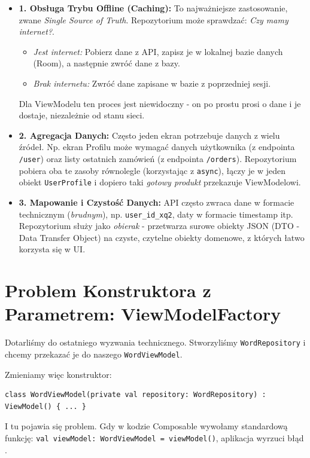 \begin{itemize}
    \item \textbf{1. Obsługa Trybu Offline (Caching):} 
    To najważniejsze zastosowanie, zwane \textit{Single Source of Truth}. Repozytorium może sprawdzać: \textit{Czy mamy internet?}.
    \begin{itemize}
        \item \textit{Jest internet:} Pobierz dane z API, zapisz je w lokalnej bazie danych (Room), a następnie zwróć dane z bazy.
        \item \textit{Brak internetu:} Zwróć dane zapisane w bazie z poprzedniej sesji.
    \end{itemize}
    Dla ViewModelu ten proces jest niewidoczny - on po prostu prosi o dane i je dostaje, niezależnie od stanu sieci.

    \item \textbf{2. Agregacja Danych:}
    Często jeden ekran potrzebuje danych z wielu źródeł. Np. ekran Profilu może wymagać danych użytkownika (z endpointa \texttt{/user}) oraz listy ostatnich zamówień (z endpointa \texttt{/orders}). Repozytorium pobiera oba te zasoby równolegle (korzystając z \texttt{async}), łączy je w jeden obiekt \texttt{UserProfile} i dopiero taki \textit{gotowy produkt} przekazuje ViewModelowi.

    \item \textbf{3. Mapowanie i Czystość Danych:}
    API często zwraca dane w formacie technicznym (\textit{brudnym}), np. \texttt{user\_id\_xq2}, daty w formacie timestamp itp. Repozytorium służy jako \textit{obierak} - przetwarza surowe obiekty JSON (DTO - Data Transfer Object) na czyste, czytelne obiekty domenowe, z których łatwo korzysta się w UI.
\end{itemize}

\section{Problem Konstruktora z Parametrem: ViewModelFactory}

Dotarliśmy do ostatniego wyzwania technicznego. Stworzyliśmy \texttt{WordRepository} i chcemy przekazać je do naszego \texttt{WordViewModel}.

Zmieniamy więc konstruktor:
\begin{verbatim}
class WordViewModel(private val repository: WordRepository) : ViewModel() { ... }
\end{verbatim}

I tu pojawia się problem. Gdy w kodzie Composable wywołamy standardową funkcję:
\texttt{val viewModel: WordViewModel = viewModel()}, aplikacja wyrzuci błąd .

